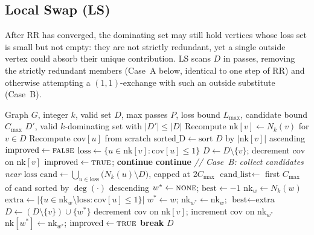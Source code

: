 \documentclass[11pt,a4paper]{article}
\newcommand{\cov}{\mathrm{cov}}
\newcommand{\loss}{\mathrm{loss}}
\begin{document}
\subsection{Local Swap (LS)}
\label{sec:ls}

After RR has converged, the dominating set may still hold vertices
whose loss set is small but not empty: they are not strictly
redundant, yet a single outside vertex could absorb their unique
contribution. LS scans $D$ in passes, removing the strictly redundant
members (Case~A below, identical to one step of RR) and otherwise
attempting a $(1,1)$-exchange with such an outside substitute
(Case~B).

\begin{algorithm}[ht]
\caption{LocalSwap$(G,k,D,P,L_{\max},C_{\max})$}
\label{alg:ls}
\begin{algorithmic}[1]
\Require Graph $G$, integer $k$, valid set $D$, max passes $P$, loss
  bound $L_{\max}$, candidate bound $C_{\max}$
\Ensure $D'$, valid $k$-dominating set with $|D'|\le|D|$
  \State Recompute $\text{nk}[v]\gets N_k(v)$ for $v\in D$
  \State Recompute $\cov[u]$ from scratch
  \State $\text{sorted\_D}\gets\text{sort } D$ by $|\text{nk}[v]|$ ascending
  \State $\text{improved}\gets\textsc{false}$
    \State $\loss\gets\{u\in\text{nk}[v]:\cov[u]\le 1\}$
    \If{$\loss=\emptyset$} 
      \State $D\gets D\setminus\{v\}$;\; decrement $\cov$ on $\text{nk}[v]$
      \State $\text{improved}\gets\textsc{true}$;\; \textbf{continue}
    \EndIf
    \If{$|\loss|>L_{\max}$} \textbf{continue} \EndIf
    \Statex \textit{// Case~B: collect candidates near $\loss$}
    \State $\text{cand}\gets\bigcup_{u\in\loss}\bigl(N_k(u)\setminus D\bigr)$,
       capped at $2C_{\max}$
    \State $\text{cand\_list}\gets$ first $C_{\max}$ of $\text{cand}$ sorted by
       $\deg(\cdot)$ descending
    \State $w^*\gets\textsc{none}$;\; $\text{best}\gets-1$
      \State $\text{nk}_w\gets N_k(w)$
      \If{$\loss\subseteq\text{nk}_w$}
        \State $\text{extra}\gets|\{u\in\text{nk}_w\setminus\loss:\cov[u]\le 1\}|$
          \State $w^*\gets w$;\; $\text{nk}_{w^*}\gets\text{nk}_w$;\; $\text{best}\gets\text{extra}$
        \EndIf
      \EndIf
    \EndFor
      \State $D\gets(D\setminus\{v\})\cup\{w^*\}$
      \State decrement $\cov$ on $\text{nk}[v]$;\; increment $\cov$ on $\text{nk}_{w^*}$
      \State $\text{nk}[w^*]\gets\text{nk}_{w^*}$;\; $\text{improved}\gets\textsc{true}$
    \EndIf
  \EndFor
   \textbf{break} \EndIf
\EndFor
\State \Return $D$
\end{algorithmic}
\end{algorithm}
\end{document}
